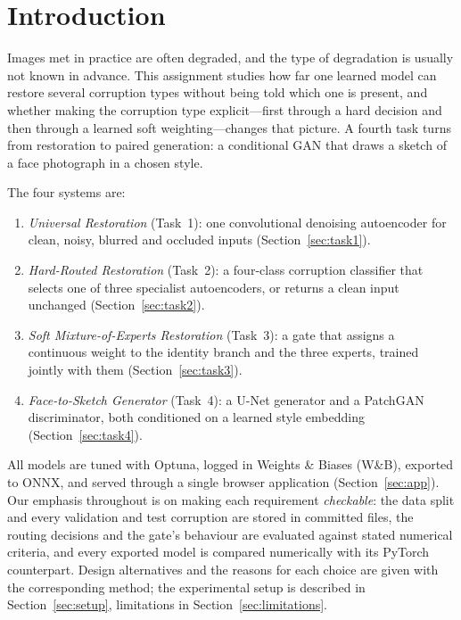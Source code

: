 \documentclass[conference]{IEEEtran}
\begin{document}
\section{Introduction}
\label{sec:intro}

Images met in practice are often degraded, and the type of degradation is
usually not known in advance. This assignment studies how far one learned
model can restore several corruption types without being told which one is
present, and whether making the corruption type explicit---first through a
hard decision and then through a learned soft weighting---changes that
picture. A fourth task turns from restoration to paired generation: a
conditional GAN that draws a sketch of a face photograph in a chosen style.

The four systems are:
\begin{enumerate}
  \item \emph{Universal Restoration} (Task~1): one convolutional denoising
  autoencoder for clean, noisy, blurred and occluded inputs
  (Section~\ref{sec:task1}).
  \item \emph{Hard-Routed Restoration} (Task~2): a four-class corruption
  classifier that selects one of three specialist autoencoders, or returns
  a clean input unchanged (Section~\ref{sec:task2}).
  \item \emph{Soft Mixture-of-Experts Restoration} (Task~3): a gate that
  assigns a continuous weight to the identity branch and the three experts,
  trained jointly with them (Section~\ref{sec:task3}).
  \item \emph{Face-to-Sketch Generator} (Task~4): a U-Net generator and a
  PatchGAN discriminator, both conditioned on a learned style embedding
  (Section~\ref{sec:task4}).
\end{enumerate}

All models are tuned with Optuna, logged in Weights \& Biases (W\&B),
exported to ONNX, and served through a single browser application
(Section~\ref{sec:app}). Our emphasis throughout is on making each
requirement \emph{checkable}: the data split and every validation and test
corruption are stored in committed files, the routing decisions and the
gate's behaviour are evaluated against stated numerical criteria, and every
exported model is compared numerically with its PyTorch counterpart.
Design alternatives and the reasons for each choice are given with the
corresponding method; the experimental setup is described in
Section~\ref{sec:setup}, limitations in Section~\ref{sec:limitations}.
\end{document}
